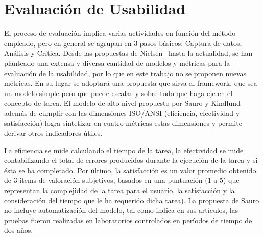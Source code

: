 \section{Evaluación de Usabilidad}
\label{sec:eval_usabilidad}

El  proceso de evaluación implica varias actividades en función del método empleado, pero en general se agrupan en 3 pasos básicos: Captura de datos, Análisis y Crítica.
Desde las propuestas de Nielsen~\cite{NIELSEN1992} hasta la actualidad, se han planteado una extensa y diversa cantidad de modelos y métricas para la evaluación de la usabilidad, por lo que en este trabajo no se proponen nuevas métricas. En su lugar se adoptará una propuesta que sirva al framework, que sea un modelo simple pero que puede escalar y sobre todo que haga eje en el concepto de tarea. El modelo de alto-nivel propuesto por Sauro y Kindlund~\cite{SK2005} además de cumplir con las dimensiones ISO/ANSI (eficiencia, efectividad y satisfacción) logra sintetizar en cuatro métricas estas dimensiones y permite derivar otros indicadores útiles.%

La eficiencia se mide calculando el tiempo de la tarea, la efectividad se mide contabilizando el total de errores producidos durante la ejecución de la tarea y si ésta se ha completado. Por último, la satisfacción es un valor promedio obtenido de 3 ítems de valoración subjetivos, basados en una puntuación (1 a 5) que representan la complejidad de la tarea para el usuario, la satisfacción y la consideración del tiempo que le ha requerido dicha tarea). 
La propuesta de Sauro no incluye automatización del modelo, tal como indica en sus artículos, las pruebas fueron realizadas en laboratorios controlados en períodos de tiempo de dos años. 
